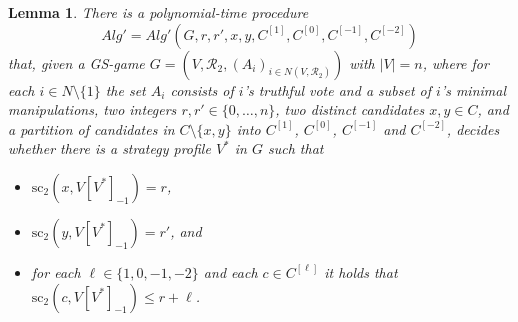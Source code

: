 \documentclass[11pt]{article}
\newtheorem{lemma}[theorem]{Lemma}
\newcommand{\calR}{\mathcal{R}}
\newcommand{\calA}{\mathit{Alg}}
\newcommand{\scr}{\mathrm{sc}}
\begin{document}
\begin{lemma}\label{lem:2app-flow}
There is a polynomial-time procedure 
$$
\calA'=\calA'(G, r, r', x, y, C^{[1]}, C^{[0]}, C^{[-1]}, C^{[-2]})
$$ 
that, 
given a GS-game $G=(V, \calR_2, (A_i)_{i\in N(V, \calR_2)})$ with $|V|=n$,
where for each $i\in N\setminus\{1\}$ the set $A_i$ consists of $i$'s truthful vote 
and a subset of $i$'s minimal manipulations, 
two integers $r, r'\in\{0, \dots, n\}$, two distinct candidates $x, y\in C$,
and a partition of candidates in $C\setminus\{x, y\}$ into $C^{[1]}$, $C^{[0]}$, $C^{[-1]}$ and $C^{[-2]}$,  
decides whether there is a strategy profile $V^*$ in $G$ such that 
\begin{itemize}
\item
$\scr_2(x, V[V^*]_{-1})=r$,
\item
$\scr_2(y, V[V^*]_{-1})=r'$, and
\item
for each $\ell\in\{1, 0, -1, -2\}$
and each $c\in C^{[\ell]}$ it holds that 
$\scr_2(c, V[V^*]_{-1})\le r+\ell$.
\end{itemize}
\end{lemma}
\end{document}
